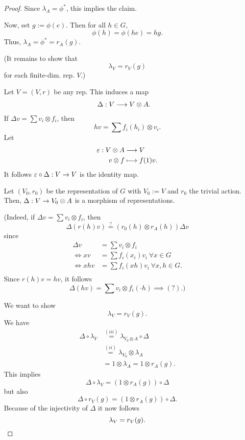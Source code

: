 \begin{proof}
	Since $\lambda_A = \phi^*$, this implies the claim.
	
	Now, set $g := \phi(e)$. Then for all $h \in G$,
	\[ \phi(h) = \phi(he) = hg. \]
	Thus, $\lambda_A = \phi^* = r_A(g)$.
	
	(It remains to show that
	\[ \lambda_V = r_V(g) \]
	for each finite-dim. rep. $V$.)
	
	Let $V = (V,r)$ be any rep. This induces a map
	\begin{align*}
\Delta: V & \overset{}{\longrightarrow}V\otimes  A.
\end{align*}
If $\Delta v = \sum{v_i} \otimes f_i$, then
\[ hv = \sum f_i(h_i) \otimes v_i.  \]
Let \begin{align*}
\varepsilon : V\otimes A & \overset{}{\longrightarrow} V\\
v\otimes f &\longmapsto f(1) v.
\end{align*}
It follows $\varepsilon \circ \Delta : V \overset{}{\rightarrow} V$ is the identity map.


Let $(V_0, r_0)$ be the representation of $G$ with $V_0 := V$ and $r_0$ the trivial action.
Then, $\Delta : V \overset{}{\rightarrow} V_0\otimes A$ is a morphism of representations.

(Indeed, if $\Delta v = \sum v_i \otimes f_i$, then 
\[ \Delta (r(h) v) \overset{?}{=} (r_0(h) \otimes r_A(h) ) \Delta v \]
since
\begin{align*}
\Delta v &= \sum v_i \otimes f_i\\
\iff xv &= \sum f_i(x_i)v_i ~ \forall x \in G\\
\iff xhv &= \sum f_i(xh) v_i ~\forall x,h \in G.\\
\end{align*}
Since $r(h) v = hv$, it follows
\[ \Delta(hv) = \sum v_i \otimes f_i(\cdot h) \implies (?). ) \]


We want to show
\[ \lambda_V = r_V(g). \]
We have
\begin{align*}
\Delta \circ \lambda_V &\overset{(iii)}{=} \lambda_{V_0 \otimes A} \circ \Delta\\
&\overset{(ii)}{=} \lambda_{V_0} \otimes \lambda_A\\
&= 1 \otimes  \lambda_A = 1 \otimes r_A(g).
\end{align*}
This implies
\[ \Delta \circ \lambda_V = (1 \otimes r_A(g)) \circ \Delta \]
but also
\[ \Delta \circ r_V(g) = (1 \otimes r_A(g)) \circ \Delta. \]
Because of the injectivity of $\Delta$ it now follows
\[ \lambda_V = r_V(g).\qedhere \]
\end{proof}

